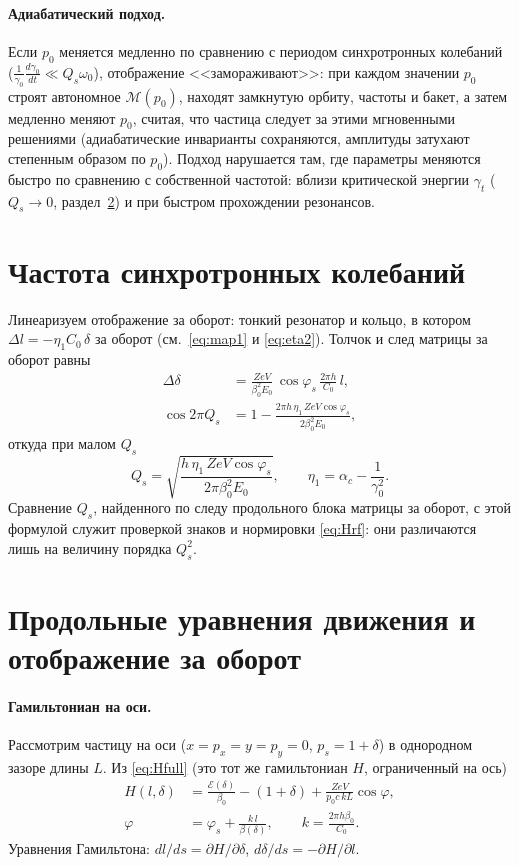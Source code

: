 \documentclass[a4paper,11pt]{article}
\numberwithin{equation}{section}
\newcommand{\cE}{\mathcal{E}}
\begin{document}
\paragraph{Адиабатический подход.} Если $p_0$ меняется медленно по сравнению с периодом синхротронных колебаний
($\frac{1}{\gamma_0}\frac{d\gamma_0}{dt}\ll Q_s\omega_0$), отображение <<замораживают>>: при каждом значении $p_0$ строят
автономное $\mathcal M(p_0)$, находят замкнутую орбиту, частоты и бакет, а затем медленно меняют $p_0$, считая,
что частица следует за этими мгновенными решениями (адиабатические инварианты сохраняются, амплитуды затухают
степенным образом по $p_0$). Подход нарушается там, где параметры меняются быстро по сравнению с собственной частотой:
вблизи критической энергии $\gamma_t$ ($Q_s\to0$, раздел~\ref{sec:eom}) и при быстром прохождении резонансов.

\section{Частота синхротронных колебаний}
Линеаризуем отображение за оборот: тонкий резонатор и кольцо, в котором $\Delta l=-\eta_1C_0\,\delta$ за оборот
(см.~\eqref{eq:map1} и \eqref{eq:eta2}). Толчок и след матрицы за оборот равны
\begin{align}
\Delta\delta&=\frac{ZeV}{\beta_0^2E_0}\,\cos\varphi_s\,\frac{2\pi h}{C_0}\,l,\\
\cos 2\pi Q_s&=1-\frac{2\pi h\,\eta_1\,ZeV\cos\varphi_s}{2\beta_0^2E_0},
\end{align}
откуда при малом $Q_s$
\begin{equation}
Q_s=\sqrt{\frac{h\,\eta_1\,ZeV\cos\varphi_s}{2\pi\beta_0^2E_0}},\qquad \eta_1=\alpha_c-\frac{1}{\gamma_0^2}.
\end{equation}
Сравнение $Q_s$, найденного по следу продольного блока матрицы за оборот, с этой формулой служит проверкой
знаков и нормировки \eqref{eq:Hrf}: они различаются лишь на величину порядка $Q_s^2$.

\section{Продольные уравнения движения и отображение за оборот}
\label{sec:eom}
\paragraph{Гамильтониан на оси.} Рассмотрим частицу на оси ($x=p_x=y=p_y=0$, $p_s=1+\delta$) в однородном зазоре
длины $L$. Из \eqref{eq:Hfull} (это тот же гамильтониан $H$, ограниченный на ось)
\begin{equation}
\begin{aligned}
H(l,\delta)&=\frac{\cE(\delta)}{\beta_0}-(1+\delta)+\frac{ZeV}{p_0c\,kL}\cos\varphi,\\
\varphi&=\varphi_s+\frac{k\,l}{\beta(\delta)},\qquad k=\frac{2\pi h\beta_0}{C_0}.
\end{aligned} \label{eq:Hax}
\end{equation}
Уравнения Гамильтона: $dl/ds=\partial H/\partial\delta$, $d\delta/ds=-\partial H/\partial l$.
\end{document}
